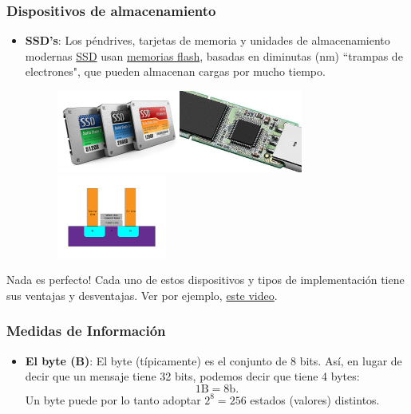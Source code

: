 \documentclass[aspectratio=169]{beamer}
\begin{document}
\begin{frame}[fragile]\frametitle{Dispositivos de almacenamiento}
\begin{itemize}
	\item \textbf{SSD's}: Los péndrives, tarjetas de memoria y unidades de almacenamiento modernas \href{https://es.wikipedia.org/wiki/Unidad_de_estado_s\%C3\%B3lido}{SSD} usan  \href{https://es.wikipedia.org/wiki/Memoria_flash}{memorias flash}, basadas en diminutas (nm) ``trampas de electrones", que pueden almacenan cargas por mucho tiempo.
	\begin{figure}
		\begin{center}
		\includegraphics[height=2.7cm]{figs/ssds.jpg}\hspace{0.5cm}\includegraphics[height=2.7cm]{figs/nand_flash_memory_mobile.jpg}\hspace{0.5cm}\includegraphics[height=2.7cm]{figs/Flash_cell_structure.svg.png}
		\end{center}
			\end{figure}
\end{itemize}
\begin{alertblock}{Nada es perfecto!}
Cada uno de estos dispositivos y tipos de implementación tiene sus ventajas y desventajas. Ver por ejemplo, \href{https://youtu.be/Sq3OjI3tVIM?si=Le57aclYU3NDnUOE}{este video}.
\end{alertblock}
\end{frame}

\begin{frame}[fragile]\frametitle{Medidas de Información}
\begin{itemize}
\item \textbf{El byte (B)}: El byte (típicamente) es el conjunto de 8 bits. Así, en lugar de decir que un mensaje tiene 32 bits, podemos decir que tiene 4 bytes:
$$
1 \text{B} = 8 \text{b}.
$$
Un byte puede por lo tanto adoptar $2^8=256$ estados (valores) distintos. 
\end{itemize}
\end{frame}
\end{document}
